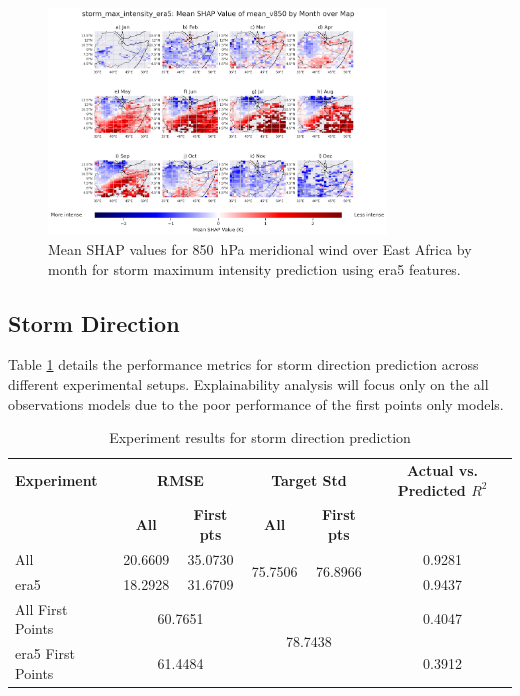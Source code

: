 \begin{figure}[ht]
    \centering
    \includegraphics[width=0.8\textwidth]{../figures/generated/experiments/storm_max_intensity/geographic_corr/storm_max_intensity_era5_shap_mean_v850_map_by_month.png}
    \caption{Mean SHAP values for \SI{850}{\hecto\pascal} meridional wind over East Africa by month for storm maximum intensity prediction using \acrshort{era5} features.}
    \label{fig:storm_max_intensity_era5_shap_mean_v850_map_by_month}
\end{figure}

\clearpage
\subsection{Storm Direction}

Table \ref{tab:storm_direction_results} details the performance metrics for storm direction prediction across different experimental setups. Explainability analysis will focus only on the all observations models due to the poor performance of the first points only models.

\begin{table}[ht]
\centering
\caption{Experiment results for storm direction prediction}
\label{tab:storm_direction_results}
\begin{tabular}{lccccc}
\hline
\textbf{Experiment} & \multicolumn{2}{c}{\textbf{RMSE}} & \multicolumn{2}{c}{\textbf{Target Std}} & \textbf{Actual vs. Predicted $R^2$} \\
\cline{2-5}
 & \textbf{All} & \textbf{First pts} & \textbf{All} & \textbf{First pts} &  \\
\hline
All              & 20.6609 & 35.0730 & \multirow{2}{*}{75.7506} & \multirow{2}{*}{76.8966} & 0.9281 \\
\acrshort{era5}             & 18.2928 & 31.6709 & & & 0.9437 \\
All First Points & \multicolumn{2}{c}{60.7651} & \multicolumn{2}{c}{\multirow{2}{*}{78.7438}} & 0.4047 \\
\acrshort{era5} First Points & \multicolumn{2}{c}{61.4484} & & & 0.3912 \\
\hline
\end{tabular}
\end{table}


